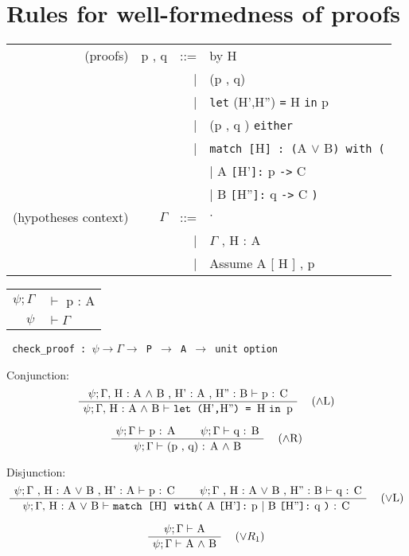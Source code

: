 \documentclass[twoside,a4paper]{article}
\begin{document}
\section{Rules for well-formedness of proofs}
\begin{center}
\begin{tabular}{rrrl}
(proofs)& p , q &::=& by H 
\\ &&|& (p , q) 
\\ &&|& {\tt let} (H',H'') {\tt =} H {\tt in} p
\\ &&|& (p , q ) {\tt either} 
\\ &&|& {\tt match [}H{\tt  ] : (}A $\vee$ B{\tt ) with (}
\\ &&&\qquad \qquad | A {\tt [}H'{\tt ]:} p {\tt ->} C 
\\ &&&\qquad \qquad | B {\tt [}H''{\tt ]:} q {\tt ->} C {\tt)}
\\
(hypotheses context)& $\Gamma$ &::=& \quad $\cdot$ \quad 
\\ &&| & $\Gamma$ , H : A
\\ &&| & Assume A [ H ] , p
\end{tabular}

\begin{tabular} {rl}
$\psi ; \Gamma$ &$\vdash$ p : A
\\
$\psi $ & $\vdash \Gamma$
\end{tabular}

{\tt
check_proof : $\psi \rightarrow \Gamma \rightarrow $ P 
$\rightarrow$ A $\rightarrow$ unit option
}
\end{center}

Conjunction:
\[
\AxiomC{$\psi ; \Gamma ,$ H : A $\wedge$ B , H' : A , H'' : B 
$\vdash$ p : C}
\RightLabel{\quad ($\wedge$L)}
\UnaryInfC{$\psi ; \Gamma ,$ H : A $\wedge$ B $\vdash$
{\tt let (}H'{\tt,}H''{\tt) = }H {\tt  in }p}
\DisplayProof
\]

\[
\AxiomC{$\psi ; \Gamma \vdash$ p : A}
\AxiomC{$\psi ; \Gamma \vdash$ q : B}
\RightLabel{\quad ($\wedge$R)}
\BinaryInfC{$\psi ; \Gamma \vdash$ (p , q) : A $\wedge$ B}
\DisplayProof
\]

Disjunction:
\[
\AxiomC{$\psi ; \Gamma$ , H : A $ \vee$ B , H' : A $\vdash$ p : C}
\AxiomC{$\psi ; \Gamma$ , H : A $ \vee$ B , H'' : B $\vdash$ q : C}
\RightLabel{\quad ($\vee$L)}
\BinaryInfC{$\psi ; \Gamma ,$  H : A 
$ \vee$ B $\vdash $
 {\tt  match [}H{\tt] with(}
 A {\tt [}H'{\tt ]:} p
 | B {\tt [}H''{\tt ]:} q {\tt)} : C
}
\DisplayProof
\]

\[
\AxiomC{$\psi ; \Gamma \vdash$ A}
\RightLabel{\quad ($\vee R_1$)}
\UnaryInfC{$\psi ; \Gamma \vdash$ A $\wedge$ B}
\DisplayProof
\]
\end{document}
